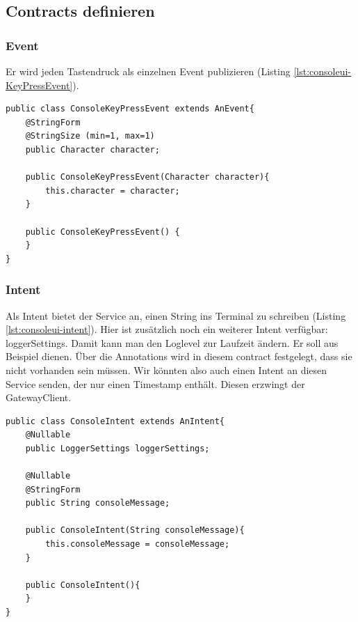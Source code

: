 \subsection{Contracts definieren}
\subsubsection{Event}
Er wird jeden Tastendruck als einzelnen Event publizieren (Listing \ref{lst:consoleui-KeyPressEvent}).
\begin{lstlisting}[caption={KeyPressEvent für den ConsoleUI-Service},label={lst:consoleui-KeyPressEvent}]
public class ConsoleKeyPressEvent extends AnEvent{
    @StringForm
    @StringSize (min=1, max=1)
    public Character character;

    public ConsoleKeyPressEvent(Character character){
        this.character = character;
    }

    public ConsoleKeyPressEvent() {
    }
}
\end{lstlisting}
\subsubsection{Intent}
Als Intent bietet der Service an, einen String ins Terminal zu schreiben (Listing \ref{lst:consoleui-intent}). Hier ist zusätzlich noch ein weiterer Intent verfügbar: loggerSettings. Damit kann man den Loglevel zur Laufzeit ändern. Er soll aus Beispiel dienen. Über die Annotations wird in diesem \Gls{contract} festgelegt, dass sie nicht vorhanden sein müssen. Wir könnten also auch einen Intent an diesen Service senden, der nur einen Timestamp enthält. Diesen erzwingt der GatewayClient.
\begin{lstlisting}[caption={Intent für den ConsoleUI-Service},label={lst:consoleui-intent}]
public class ConsoleIntent extends AnIntent{
    @Nullable
    public LoggerSettings loggerSettings;

    @Nullable
    @StringForm
    public String consoleMessage;

    public ConsoleIntent(String consoleMessage){
        this.consoleMessage = consoleMessage;
    }

    public ConsoleIntent(){
    }
}
\end{lstlisting}
